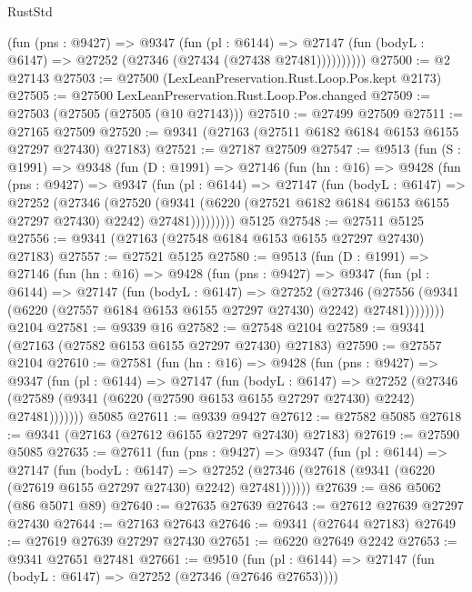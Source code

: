 \begin{lexlean}{RustStd}
\begin{coremodule}
            (fun (pns : @9427) =>
            @9347
              (fun (pl : @6144) =>
              @27147 (fun (bodyL : @6147) => @27252 (@27346 (@27434 (@27438 @27481))))))))))
@27500 := @2 @27143
@27503 := @27500 (LexLeanPreservation.Rust.Loop.Pos.kept @2173)
@27505 := @27500 LexLeanPreservation.Rust.Loop.Pos.changed
@27509 := @27503 (@27505 (@27505 (@10 @27143)))
@27510 := @27499 @27509
@27511 := @27165 @27509
@27520 := @9341 (@27163 (@27511 @6182 @6184 @6153 @6155 @27297 @27430) @27183)
@27521 := @27187 @27509
@27547 := @9513
    (fun (S : @1991) =>
    @9348
      (fun (D : @1991) =>
      @27146
        (fun (hn : @16) =>
        @9428
          (fun (pns : @9427) =>
          @9347
            (fun (pl : @6144) =>
            @27147
              (fun (bodyL : @6147) =>
              @27252
                (@27346
                  (@27520
                    (@9341
                      (@6220 (@27521 @6182 @6184 @6153 @6155 @27297 @27430) @2242)
                      @27481)))))))))
    @5125
@27548 := @27511 @5125
@27556 := @9341 (@27163 (@27548 @6184 @6153 @6155 @27297 @27430) @27183)
@27557 := @27521 @5125
@27580 := @9513
    (fun (D : @1991) =>
    @27146
      (fun (hn : @16) =>
      @9428
        (fun (pns : @9427) =>
        @9347
          (fun (pl : @6144) =>
          @27147
            (fun (bodyL : @6147) =>
            @27252
              (@27346
                (@27556 (@9341 (@6220 (@27557 @6184 @6153 @6155 @27297 @27430) @2242) @27481))))))))
    @2104
@27581 := @9339 @16
@27582 := @27548 @2104
@27589 := @9341 (@27163 (@27582 @6153 @6155 @27297 @27430) @27183)
@27590 := @27557 @2104
@27610 := @27581
    (fun (hn : @16) =>
    @9428
      (fun (pns : @9427) =>
      @9347
        (fun (pl : @6144) =>
        @27147
          (fun (bodyL : @6147) =>
          @27252
            (@27346 (@27589 (@9341 (@6220 (@27590 @6153 @6155 @27297 @27430) @2242) @27481)))))))
    @5085
@27611 := @9339 @9427
@27612 := @27582 @5085
@27618 := @9341 (@27163 (@27612 @6155 @27297 @27430) @27183)
@27619 := @27590 @5085
@27635 := @27611
    (fun (pns : @9427) =>
    @9347
      (fun (pl : @6144) =>
      @27147
        (fun (bodyL : @6147) =>
        @27252 (@27346 (@27618 (@9341 (@6220 (@27619 @6155 @27297 @27430) @2242) @27481))))))
@27639 := @86 @5062 (@86 @5071 @89)
@27640 := @27635 @27639
@27643 := @27612 @27639 @27297 @27430
@27644 := @27163 @27643
@27646 := @9341 (@27644 @27183)
@27649 := @27619 @27639 @27297 @27430
@27651 := @6220 @27649 @2242
@27653 := @9341 @27651 @27481
@27661 := @9510
    (fun (pl : @6144) => @27147 (fun (bodyL : @6147) => @27252 (@27346 (@27646 @27653))))

\end{coremodule}
\end{lexlean}
